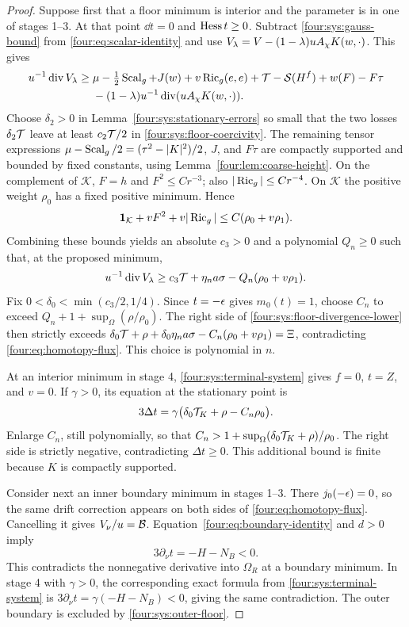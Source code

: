 \begin{proof}
Suppose first that a floor minimum is interior and the parameter is in
one of stages 1--3.  At that point $\dd t=0$ and $\operatorname{Hess} t\ge0$.
Subtract \eqref{four:sys:gauss-bound} from \eqref{four:eq:scalar-identity} and
use $V_\lambda=V-(1-\lambda)uA_\chi K(w,\cdot)$.  This gives
\begin{align*}
 u^{-1}\operatorname{div} V_\lambda\ge{}&
 \mu-\tfrac12\operatorname{Scal}_g+J(w)+v\operatorname{Ric}_g(e,e)
        +\mathcal T-\mathcal S(H^f)+w(F)-F\tau\\
 &-(1-\lambda)u^{-1}\operatorname{div}(uA_\chi K(w,\cdot)).
\end{align*}
Choose $\delta_2>0$ in Lemma~\ref{four:sys:stationary-errors} so small that
the two losses $\delta_2\mathcal T$ leave at least $c_2\mathcal T/2$ in
\eqref{four:sys:floor-coercivity}.  The remaining tensor expressions
$\mu-\operatorname{Scal}_g/2=(\tau^2-|K|^2)/2$, $J$, and $F\tau$ are compactly
supported and bounded by fixed constants, using
Lemma~\ref{four:lem:coarse-height}.  On the complement of $\mathcal K$,
$F=h$ and $F^2\le C r^{-3}$; also
$|\operatorname{Ric}_g|\le C r^{-4}$.  On $\mathcal K$ the positive weight
$\rho_0$ has a fixed positive minimum.  Hence
\[
 \mathbf1_{\mathcal K}+vF^2+v|\operatorname{Ric}_g|
                   \le C(\rho_0+v\rho_1).
\]
Combining these bounds yields an absolute $c_3>0$ and a polynomial
$Q_n\ge0$ such that, at the proposed minimum,
\begin{equation}\label{four:sys:floor-divergence-lower}
 u^{-1}\operatorname{div} V_\lambda
   \ge c_3\mathcal T+\eta_n a\sigma-Q_n(\rho_0+v\rho_1).
\end{equation}
Fix
$0<\delta_0<\min(c_3/2,1/4)$.
Since $t=-\epsilon$ gives $m_0(t)=1$, choose $C_n$ to exceed
$Q_n+1+\sup_\Omega(\rho/\rho_0)$.  The right side of
\eqref{four:sys:floor-divergence-lower} then strictly exceeds
$\delta_0\mathcal T+\rho+\delta_0\eta_n a\sigma-C_n(\rho_0+v\rho_1)
=\Xi$, contradicting \eqref{four:eq:homotopy-flux}.  This choice is
polynomial in $n$.

At an interior minimum in stage 4, \eqref{four:sys:terminal-system} gives
$f=0$, $t=Z$, and $v=0$.  If $\gamma>0$, its equation at the
stationary point is
\[
 3\Delta t=\gamma\bigl(\delta_0\mathcal T_K+\rho-C_n\rho_0\bigr).
\]
Enlarge $C_n$, still polynomially, so that
$C_n>1+\sup_\Omega(\delta_0\mathcal T_K+\rho)/\rho_0$.
The right side is strictly negative, contradicting $\Delta t\ge0$.
This additional bound is finite because $K$ is compactly supported.

Consider next an inner boundary minimum in stages 1--3.
There $j_0(-\epsilon)=0$, so the same drift correction appears on both
sides of \eqref{four:eq:homotopy-flux}.  Cancelling it gives $V_\nu/u=\mathcal B$.
Equation~\eqref{four:eq:boundary-identity} and $d>0$ imply
\[
 3\partial_\nu t=-H-N_B<0.
\]
This contradicts the nonnegative derivative into $\Omega_R$ at a
boundary minimum.  In stage 4 with $\gamma>0$, the corresponding exact
formula from \eqref{four:sys:terminal-system} is
$3\partial_\nu t=\gamma(-H-N_B)<0$, giving the same contradiction.
The outer boundary is excluded by \eqref{four:sys:outer-floor}.


\end{proof}
